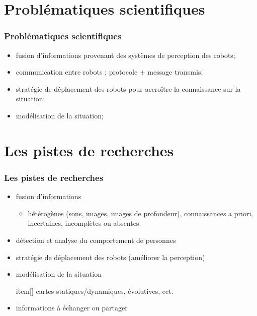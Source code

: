 \documentclass[usepdftitle=false, xcolor=dvipsnames, 12, c]{beamer}
\begin{document}
% 
\section{Problématiques scientifiques}
\begin{frame}[label=pbScientifiques]
\frametitle{Problématiques scientifiques}
\begin{itemize}
    \item fusion d'informations provenant des systèmes de perception des robots;
    \item communication entre robots ; protocole + message transmis;
    \item stratégie de déplacement des robots pour accroître la connaissance sur la situation;
    \item modélisation de la situation;
\end{itemize}
\end{frame}

\section{Les pistes de recherches}
\begin{frame}[label=pistesRecherches]
\frametitle{Les pistes de recherches}
    \begin{itemize}
        \item fusion d'informations 
        \begin{itemize}
            \item[] hétérogènes (sons, images, images de profondeur), connaissances a priori, incertaines, incomplètes ou absentes.
        \end{itemize}
        \item détection et analyse du comportement de personnes 
        \item stratégie de déplacement des robots (améliorer la perception)
        \item modélisation de la situation
        \begin{itemize}
            item[] cartes statiques/dynamiques, évolutives, ect.
        \end{itemize}
        \item informations à échanger ou partager
    \end{itemize}
\end{frame}
\end{document}

